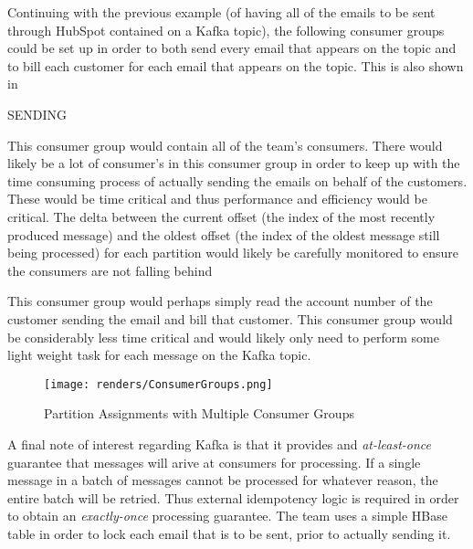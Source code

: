 Continuing with the previous example (of having all of the emails to be sent through HubSpot contained on a Kafka topic), the following consumer groups could be set up in order to both send every email that appears on the topic and to bill each customer for each email that appears on the topic. This is also shown in 
\begin{labeling}{SENDING}
\item[SENDING]{This consumer group would contain all of the \team{} team's consumers. There would likely be a lot of consumer's in this consumer group in order to keep up with the time consuming process of actually sending the emails on behalf of the customers. These would be time critical and thus performance and efficiency would be critical. The delta between the current offset (the index of the most recently produced message) and the oldest offset (the index of the oldest message still being processed) for each partition would likely be carefully monitored to ensure the consumers are not falling behind}
\item[BILLING]{This consumer group would perhaps simply read the account number of the customer sending the email and bill that customer. This consumer group would be considerably less time critical and would likely only need to perform some light weight task for each message on the Kafka topic.}
\end{labeling}


\begin{figure}[H]
      \centering
      \texttt{[image: renders/ConsumerGroups.png]}
      \caption{Partition Assignments with Multiple Consumer Groups}
      \label{fig:consumerGroups}
\end{figure}  

A final note of interest regarding Kafka is that it provides and \textit{at-least-once} guarantee that messages will arive at consumers for processing. If a single message in a batch of messages cannot be processed for whatever reason, the entire batch will be retried. Thus external idempotency logic is required in order to obtain an \textit{exactly-once} processing guarantee. The \team{} team uses a simple HBase table in order to lock each email that is to be sent, prior to actually sending it. 


